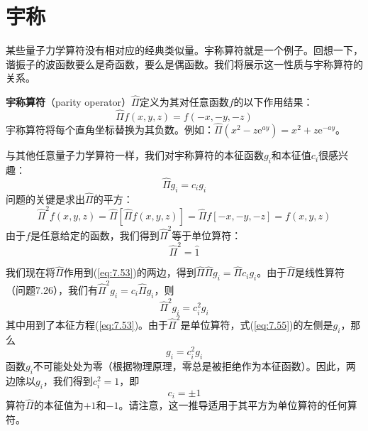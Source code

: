 \section{宇称}
\label{sec:7.5 Parity}
    某些量子力学算符没有相对应的经典类似量。宇称算符就是一个例子。回想一下，谐振子的波函数要么是奇函数，要么是偶函数。我们将展示这一性质与宇称算符的关系。

    \textbf{宇称算符}（parity operator）$\hat{\Pi}$定义为其对任意函数$f$的以下作用结果：
    \begin{equation}
        \boxed{
            \hat{\Pi}f\left(x,y,z\right) = f\left(-x,-y,-z\right)
        }
        \label{eq:7.52}
    \end{equation}
    宇称算符将每个直角坐标替换为其负数。例如：$\hat{\Pi}\left(x^2 - z\mathrm{e}^{ay}\right) = x^2 + z\mathrm{e}^{-ay}$。

    与其他任意量子力学算符一样，我们对宇称算符的本征函数$g_i$和本征值$c_i$很感兴趣：
    \begin{equation}
        \hat{\Pi}g_i = c_ig_i
        \label{eq:7.53}
    \end{equation}
    问题的关键是求出$\hat{\Pi}$的平方：
    \begin{equation*}
        \hat{\Pi}^2f\left(x,y,z\right) = \hat{\Pi}\left[\hat{\Pi}f\left(x,y,z\right)\right] = \hat{\Pi}f\left[-x,-y,-z\right] = f\left(x,y,z\right)
    \end{equation*}
    由于$f$是任意给定的函数，我们得到$\hat{\Pi}^2$等于单位算符：
    \begin{equation}
        \hat{\Pi}^2 = \hat{1}
        \label{eq:7.54}
    \end{equation}
    
    我们现在将$\hat{\Pi}$作用到(\ref{eq:7.53})的两边，得到$\hat{\Pi}\hat{\Pi}g_i = \hat{\Pi}c_ig_i$。由于$\hat{\Pi}$是线性算符（问题7.26），我们有$\hat{\Pi}^2g_i = c_i\hat{\Pi}g_i$，则
    \begin{equation}
        \hat{\Pi}^2g_i = c_i^2g_i
        \label{eq:7.55}
    \end{equation}
    其中用到了本征方程(\ref{eq:7.53})。由于$\hat{\Pi}^2$是单位算符，式(\ref{eq:7.55})的左侧是$g_i$，那么
    \begin{equation*}
        g_i = c_i^2g_i
    \end{equation*}
    函数$g_i$不可能处处为零（根据物理原理，零总是被拒绝作为本征函数）。因此，两边除以$g_i$，我们得到$c_i^2 = 1$，即
    \begin{equation}
        c_i = \pm 1
        \label{eq:7.56}
    \end{equation}
    算符$\hat{\Pi}$的本征值为$+1$和$-1$。请注意，这一推导适用于其平方为单位算符的任何算符。

